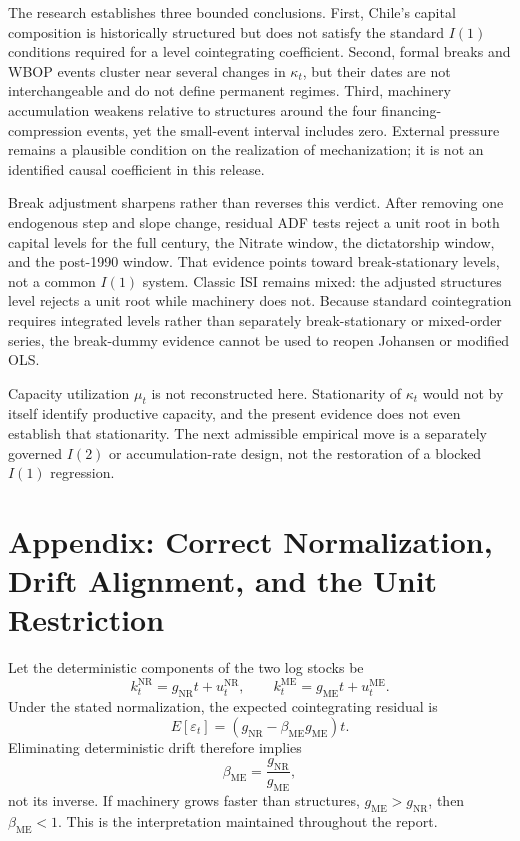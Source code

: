 \documentclass[11pt,a4paper]{article}
\begin{document}
The research establishes three bounded conclusions. First, Chile's capital composition is historically structured but does not satisfy the standard \(I(1)\) conditions required for a level cointegrating coefficient. Second, formal breaks and WBOP events cluster near several changes in \(\kappa_t\), but their dates are not interchangeable and do not define permanent regimes. Third, machinery accumulation weakens relative to structures around the four financing-compression events, yet the small-event interval includes zero. External pressure remains a plausible condition on the realization of mechanization; it is not an identified causal coefficient in this release.

Break adjustment sharpens rather than reverses this verdict. After removing one endogenous step and slope change, residual ADF tests reject a unit root in both capital levels for the full century, the Nitrate window, the dictatorship window, and the post-1990 window. That evidence points toward break-stationary levels, not a common \(I(1)\) system. Classic ISI remains mixed: the adjusted structures level rejects a unit root while machinery does not. Because standard cointegration requires integrated levels rather than separately break-stationary or mixed-order series, the break-dummy evidence cannot be used to reopen Johansen or modified OLS.

Capacity utilization \(\mu_t\) is not reconstructed here. Stationarity of \(\kappa_t\) would not by itself identify productive capacity, and the present evidence does not even establish that stationarity. The next admissible empirical move is a separately governed \(I(2)\) or accumulation-rate design, not the restoration of a blocked \(I(1)\) regression.

\FloatBarrier
\newpage
\section*{Appendix: Correct Normalization, Drift Alignment, and the Unit Restriction}

Let the deterministic components of the two log stocks be
\begin{equation}
k_t^{\mathrm{NR}}=g_{\mathrm{NR}}t+u_t^{\mathrm{NR}},
\qquad
k_t^{\mathrm{ME}}=g_{\mathrm{ME}}t+u_t^{\mathrm{ME}}.
\end{equation}
Under the stated normalization, the expected cointegrating residual is
\begin{equation}
E[\varepsilon_t]
=\left(g_{\mathrm{NR}}-\beta_{\mathrm{ME}}g_{\mathrm{ME}}\right)t.
\end{equation}
Eliminating deterministic drift therefore implies
\begin{equation}
\beta_{\mathrm{ME}}=\frac{g_{\mathrm{NR}}}{g_{\mathrm{ME}}},
\end{equation}
not its inverse. If machinery grows faster than structures, \(g_{\mathrm{ME}}>g_{\mathrm{NR}}\), then \(\beta_{\mathrm{ME}}<1\). This is the interpretation maintained throughout the report.
\end{document}
